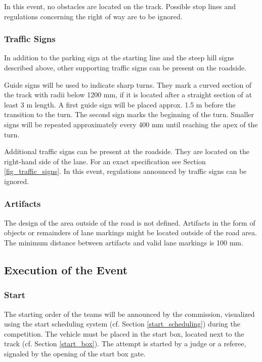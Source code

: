 
In this event, no obstacles are located on the track. Possible stop lines and
regulations concerning the right of way are to be ignored.

\subsubsection{Traffic Signs}
\label{traffic_signs}

In addition to the parking sign at the starting line and the steep hill signs
described above, other supporting traffic signs can be present on the roadside.

Guide signs will be used to indicate sharp turns. They mark a curved section of
the track with radii below 1200 mm, if it is located after a straight section
of at least 3 m length. A first guide sign will be placed approx. 1.5 m before
the transition to the turn. The second sign marks the beginning of the turn.
Smaller signs will be repeated approximately every 400 mm until reaching the
apex of the turn.

Additional traffic signs can be present at the roadside. They are located on
the right-hand side of the lane. For an exact specification see Section
\ref{fig_traffic_signs}. In this event, regulations announced by traffic signs
can be ignored.

\subsubsection{Artifacts}
\label{artifacts}

The design of the area outside of the road is not defined. Artifacts in the
form of objects or remainders of lane markings might be located outside of the
road area. The minimum distance between artifacts and valid lane markings is
100 mm.

\subsection{Execution of the Event}

\subsubsection{Start}

The starting order of the teams will be announced by the commission, visualized
using the start scheduling system (cf. Section \ref{start_scheduling}) during
the competition. The vehicle must be placed in the start box, located next to
the track (cf. Section \ref{start_box}). The attempt is started by a judge or a
referee, signaled by the opening of the start box gate.

